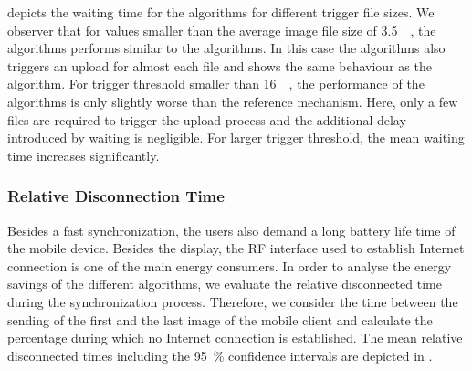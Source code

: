  depicts the waiting time for the \algosize algorithms for different trigger file sizes.
We observer that for values smaller than the average image file size of \SI{3.5}{\mega\byte}, the \algosize algorithms performs similar to the \algoimmediate algorithms.
In this case the \algosize algorithms also triggers an upload for almost each file and  shows the same behaviour as the \algoimmediate algorithm.
For trigger threshold smaller than \SI{16}{\mega\byte}, the performance of the \algosize algorithms is only slightly worse than the reference mechanism.
Here, only a few files are required to trigger the upload process and the additional delay introduced by waiting is negligible.
For larger trigger threshold, the mean waiting time increases significantly.

\subsubsection*{Relative Disconnection Time}\label{sec:application:cloud_file_synchronisation:numerical_evaluation:relative_disconnection_time}

Besides a fast synchronization, the users also demand a long battery life time of the mobile device.
Besides the display, the RF interface used to establish Internet connection is one of the main energy consumers.
In order to analyse the energy savings of the different algorithms, we evaluate the relative disconnected time  \relativeDisconnectedTime during the synchronization process.
Therefore, we consider the time between the sending of the first and the last image of the mobile client and calculate the percentage during which no Internet connection is established.
The mean relative disconnected times including the \SI{95}{\percent} confidence intervals are depicted in . 

